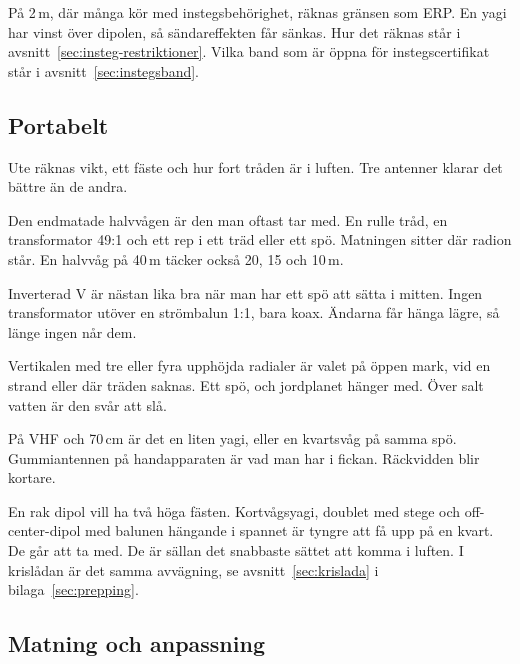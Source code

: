 På 2\,m, där många kör med instegsbehörighet, räknas gränsen som
ERP. En yagi har vinst över dipolen, så sändareffekten får sänkas.
Hur det räknas står i avsnitt~\ref{sec:insteg-restriktioner}. Vilka
band som är öppna för instegscertifikat står i
avsnitt~\ref{sec:instegsband}.

\subsection{Portabelt}
\label{sec:portabelt}

Ute räknas vikt, ett fäste och hur fort tråden är i luften. Tre
antenner klarar det bättre än de andra.

Den endmatade halvvågen är den man oftast tar med. En rulle tråd, en
transformator 49:1 och ett rep i ett träd eller ett spö. Matningen
sitter där radion står. En halvvåg på 40\,m täcker också 20, 15 och
10\,m.

Inverterad V är nästan lika bra när man har ett spö att sätta i mitten.
Ingen transformator utöver en strömbalun 1:1, bara koax. Ändarna får
hänga lägre, så länge ingen når dem.

Vertikalen med tre eller fyra upphöjda radialer är valet på öppen
mark, vid en strand eller där träden saknas. Ett spö, och jordplanet
hänger med. Över salt vatten är den svår att slå.

På VHF och 70\,cm är det en liten yagi, eller en kvartsvåg på samma
spö. Gummiantennen på handapparaten är vad man har i fickan.
Räckvidden blir kortare.

En rak dipol vill ha två höga fästen. Kortvågsyagi, doublet med stege
och off-center-dipol med balunen hängande i spannet är tyngre att få
upp på en kvart. De går att ta med. De är sällan det snabbaste sättet
att komma i luften. I krislådan är det samma avvägning, se
avsnitt~\ref{sec:krislada} i bilaga~\ref{sec:prepping}.

\subsection{Matning och anpassning}

